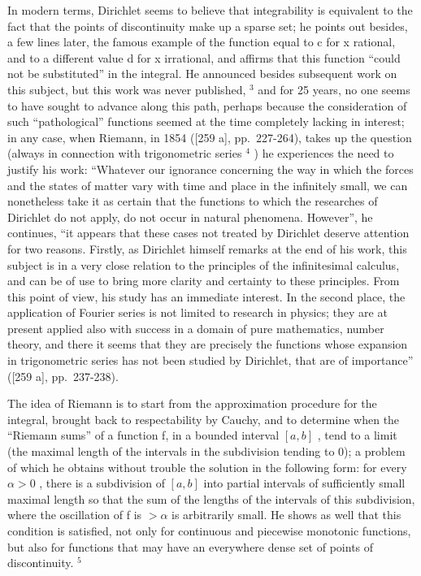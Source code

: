 In modern terms, Dirichlet seems to believe that integrability is equivalent to the fact that the points of discontinuity make up a sparse set; he points out besides, a few lines later, the famous example of the function equal to c for x rational, and to a different value d for x irrational, and affirms that this function ``could not be substituted'' in the integral. He announced besides subsequent work on this subject, but this work was never published, \(^{3}\) and for 25 years, no one seems to have sought to advance along this path, perhaps because the consideration of such ``pathological'' functions seemed at the time completely lacking in interest; in any case, when Riemann, in 1854 ({[}259 a{]}, pp.~227-264), takes up the question (always in connection with trigonometric series \(^{4}\) ) he experiences the need to justify his work: ``Whatever our ignorance concerning the way in which the forces and the states of matter vary with time and place in the infinitely small, we can nonetheless take it as certain that the functions to which the researches of Dirichlet do not apply, do not occur in natural phenomena. However'', he continues, ``it appears that these cases not treated by Dirichlet deserve attention for two reasons. Firstly, as Dirichlet himself remarks at the end of his work, this subject is in a very close relation to the principles of the infinitesimal calculus, and can be of use to bring more clarity and certainty to these principles. From this point of view, his study has an immediate interest. In the second place, the application of Fourier series is not limited to research in physics; they are at present applied also with success in a domain of pure mathematics, number theory, and there it seems that they are precisely the functions whose expansion in trigonometric series has not been studied by Dirichlet, that are of importance'' ({[}259 a{]}, pp.~237-238).

The idea of Riemann is to start from the approximation procedure for the integral, brought back to respectability by Cauchy, and to determine when the ``Riemann sums'' of a function f, in a bounded interval \([a, b]\) , tend to a limit (the maximal length of the intervals in the subdivision tending to 0); a problem of which he obtains without trouble the solution in the following form: for every \(\alpha > 0\) , there is a subdivision of \([a, b]\) into partial intervals of sufficiently small maximal length so that the sum of the lengths of the intervals of this subdivision, where the oscillation of f is \(>\alpha\) is arbitrarily small. He shows as well that this condition is satisfied, not only for continuous and piecewise monotonic functions, but also for functions that may have an everywhere dense set of points of discontinuity. \(^{5}\)

